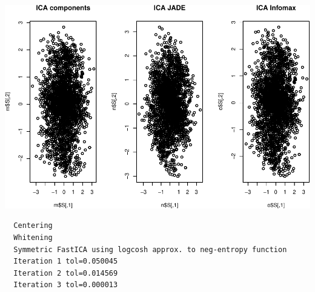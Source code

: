 \documentclass[12pt,twoside]{amherstthesis}
\begin{document}
  \begin{center}\includegraphics{ICA_Stats_Comps_files/figure-latex/unnamed-chunk-7-2} \end{center}
  
  \begin{Shaded}
  \begin{Highlighting}[]
  \StringTok{ }\NormalTok{,} \NormalTok{, } \NormalTok{, } \NormalTok{, }
                \NormalTok{, } \NormalTok{, } \NormalTok{, }
                \NormalTok{, } \NormalTok{)}
  \end{Highlighting}
  \end{Shaded}
  
  \begin{verbatim}
  Centering
  Whitening
  Symmetric FastICA using logcosh approx. to neg-entropy function
  Iteration 1 tol=0.050045
  Iteration 2 tol=0.014569
  Iteration 3 tol=0.000013
  \end{verbatim}
  
\end{document}
